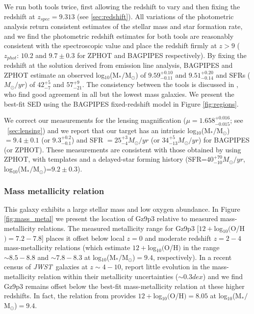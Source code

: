 \documentclass[sn-mathphys]{sn-jnl}%
\theoremstyle{thmstyleone}%
\theoremstyle{thmstyletwo}%
\theoremstyle{thmstylethree}%
\newcommand{\jwst}{\textit{JWST}}
\begin{document}
We run both tools twice, first allowing the redshift to vary and then  fixing the redshift at $z_{spec}=9.313$ (see \ref{sec:redshift}). All variations of the photometric analysis return consistent estimates of the stellar mass and star formation rate, and we find the photometric redshift estimates for both tools are reasonably consistent with the spectroscopic value and place the redshift firmly at $z>9$ ($z_{phot}$: $10.2$ and $9.7\pm0.3$ for ZPHOT and BAGPIPES respectively).
By fixing the redshift at the solution derived from emission line analysis, BAGPIPES and ZPHOT estimate an observed log$_{10}$(M$_*/$M$_\odot$) of $9.59^{+0.10}_{-0.11}$ and $9.51^{+0.20}_{-0.14}$ and SFRs ($M_\odot/yr$) of $42^{+5}_{-7}$ and $57^{+9}_{-21}$. The consistency between the tools is discussed in \cite{Santini2022}, who find good agreement in all but the lowest mass galaxies. We present the best-fit SED using the BAGPIPES fixed-redshift model in Figure \ref{fig:regions}.

We correct our measurements for the lensing magnification ($\mu=1.658^{+0.016}_{-0.015}$; see ~\ref{sec:lensing}) and we report that our target has an intrinsic log$_{10}$(M$_*/$M$_\odot$) $=9.4\pm0.1$ (or $9.3^{+0.2}_{-0.1}$) and SFR $=25^{+3}_{-4} M_\odot/yr$ (or $34^{+5}_{-13} M_\odot/yr$) for BAGPIPES (or ZPHOT).
These measurements are consistent with those obtained by \cite{Castellano22b} using ZPHOT, with \cite{Charlot00} templates and a delayed-star forming history (SFR=$40^{+70}_{-10} M_\odot/yr$, log$_{10}$(M$_*/$M$_\odot$)=$9.2\pm0.3$).

\subsubsection{Mass metallicity relation}
This galaxy exhibits a large stellar mass and low oxygen abundance. In Figure \ref{fig:mass_metal} we present the location of Gz9p3 relative to measured mass-metallicity relations. The measured metallicity range for Gz9p3 [$12+$log$_{10}($O/H$) = 7.2-7.8$] places it offset below local $z=0$ \citep{Andrews13, Maiolino_2008} and moderate redshift $z=2-4$ mass-metallicity relations \citep{Sanders21, Maiolino_2008} (which estimate $12+$log$_{10}($O/H$)$ in the range $\sim8.5-8.8$ and $\sim7.8-8.3$ at log$_{10}$(M$_*/$M$_\odot$)$=9.4$, respectively). In a recent census of \jwst\ galaxies at $z\sim4-10$, \cite{Nakajima23} report little evolution in the mass-metallicity relation within their metallicity uncertainties ($\sim0.3dex$) and we find  Gz9p3 remains offset below the best-fit mass-metallicity relation at these higher redshifts. In fact, the relation from \cite{Nakajima23} provides $12+$log$_{10}($O/H$) = 8.05$ at log$_{10}$(M$_*/$M$_\odot$)$=9.4$. 
\end{document}
